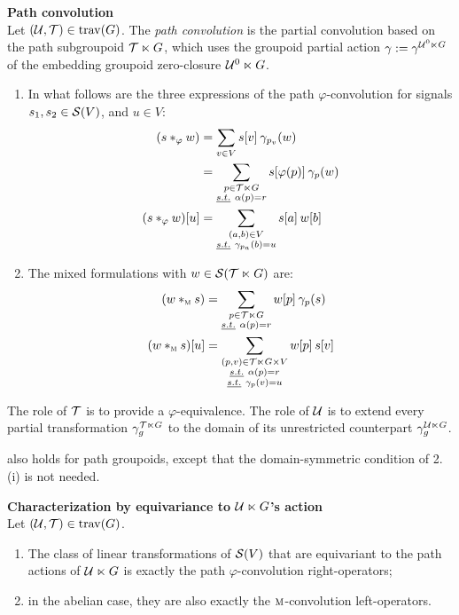 \begin{definition}\textbf{Path convolution}\\
Let $(\cu, \ct) \in \tree(G)$. The \emph{path convolution} is the partial convolution based on the path subgroupoid $\ct \ltimes G$, which uses the groupoid partial action $\gamma := \gamma^{\cu^0 \ltimes G}$ of the embedding groupoid zero-closure $\cu^0 \ltimes G$.
\begin{enumerate}[label=(\roman*)]
  \item In what follows are the three expressions of the path $\varphi$-convolution for signals $s_1, s_2 \in \cs(V)$, and $u \in V$:
\begin{align*}
(s \ast_\varphi w) & = \displaystyle\sum_{v \in V} s[v] \h{2} \gamma_{p_v}(w)\\
                   & = \displaystyle\sum_{\substack{p \in \ct \ltimes G\\ \st \alpha(p) = r}} s[\varphi(p)] \h{2} \gamma_{p}(w)\\
(s \ast_\varphi w)[u] & = \displaystyle\sum_{\substack{(a,b) \in V\\ \st \gamma_{p_a}(b)=u}} s[a] \h{2} w[b]
\end{align*}
  \item The mixed formulations with $w \in \cs(\ct \ltimes G)$ are:
\begin{align*}
(w \ast_{\M} s) & = \displaystyle\sum_{\substack{p \in \ct \ltimes G\\ \st \alpha(p) = r}} w[p] \h{2} \gamma_{p}(s)\\
(w \ast_{\M} s)[u] & = \displaystyle\sum_{\substack{(p,v) \in \ct \ltimes G \times V\\ \st \alpha(p) = r\\ \st \gamma_{p}(v)=u}} w[p] \h{2} s[v]
\end{align*}
\end{enumerate}
\end{definition}

\begin{remark}The role of $\ct$ is to provide a $\varphi$-equivalence. The role of $\cu$ is to extend every partial transformation $\gamma^{\ct \ltimes G}_g$ to the domain of its unrestricted counterpart $\gamma^{\cu \ltimes G}_g$.
\end{remark}

 also holds for path groupoids, except that the domain-symmetric condition of 2.(i) is not needed.

\begin{theorem}\textbf{Characterization by equivariance to $\cu \ltimes G$'s action}\\
Let $(\cu, \ct) \in \tree(G)$.
\begin{enumerate}[label=(\roman*)]
\item The class of linear transformations of $\cs(V)$ that are equivariant to the path actions of $\cu \ltimes G$ is exactly the path $\varphi$-convolution right-operators;
\item in the abelian case, they are also exactly the $\M$-convolution left-operators.
\end{enumerate}
\label{th:equiU}
\end{theorem}

